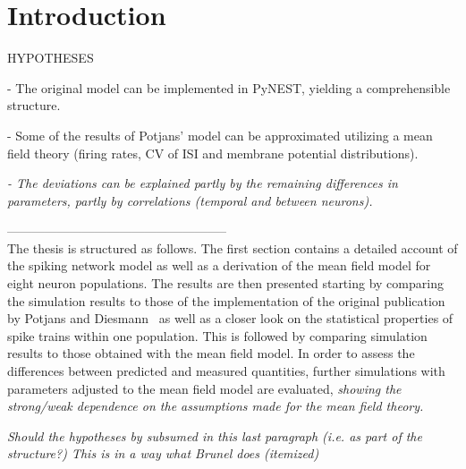 \section{Introduction}
\label{sec:intro}

HYPOTHESES

- The original model can be implemented in PyNEST, yielding a 
comprehensible structure.

- Some of the results of Potjans' model can be approximated utilizing a 
mean field theory (firing rates, CV of ISI and membrane potential
distributions).

\emph{- The deviations can be explained partly by the remaining differences 
in parameters, partly by correlations (temporal and between neurons).}

-----------------------------------------------------\\












The thesis is structured as follows. The first section contains a detailed account 
of the spiking network model as well as a derivation of the mean field model 
for eight neuron populations.  
The results are then presented starting by comparing the simulation results to 
those of the implementation of the original publication by Potjans and 
Diesmann~\cite{potjans2014} as well as a closer look on the statistical properties 
of spike trains within one population. 
This is followed by comparing simulation results to those
obtained with the mean field model. In order to assess the differences between 
predicted and measured quantities, 
further simulations with parameters adjusted 
to the mean field model are evaluated, 
\emph{showing the strong/weak dependence on the assumptions made for the mean
field theory.}

\emph{Should the hypotheses by subsumed in this last paragraph (i.e. as part of the structure?)
This is in a way what Brunel does (itemized)}


